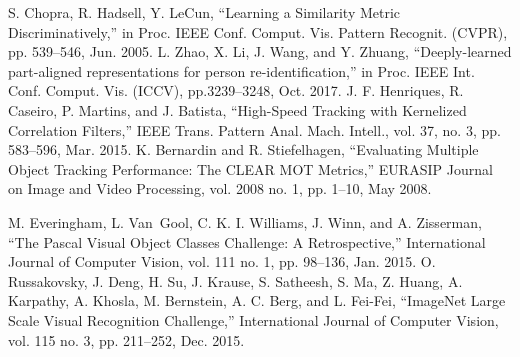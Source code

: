 \documentclass[journal]{IEEEtran}
\newcounter{ct}
\begin{document}
\begin{thebibliography}{00}
S. Chopra, R. Hadsell, Y. LeCun, ``Learning a Similarity Metric Discriminatively,'' in Proc. IEEE Conf. Comput. Vis. Pattern Recognit. (CVPR), pp. 539--546, Jun. 2005.
L. Zhao, X. Li, J. Wang, and Y. Zhuang, ``Deeply-learned part-aligned representations for person re-identification,'' in Proc. IEEE Int. Conf. Comput. Vis. (ICCV), pp.3239--3248, Oct. 2017.
 J. F. Henriques, R. Caseiro, P. Martins, and J. Batista, ``High-Speed Tracking with Kernelized Correlation Filters,'' IEEE Trans. Pattern Anal. Mach. Intell., vol. 37, no. 3, pp. 583--596, Mar. 2015.
 K. Bernardin and R. Stiefelhagen, ``Evaluating Multiple Object Tracking Performance: The CLEAR MOT Metrics,'' EURASIP Journal on Image and Video Processing, vol. 2008 no. 1, pp. 1--10, May 2008.

 M. Everingham, L. Van~Gool, C. K. I. Williams, J. Winn, and A. Zisserman, ``The Pascal Visual Object Classes Challenge: A Retrospective,'' International Journal of Computer Vision, vol. 111 no. 1, pp. 98--136, Jan. 2015.
O. Russakovsky, J. Deng, H. Su, J. Krause, S. Satheesh, S. Ma, Z. Huang, A. Karpathy, A. Khosla, M. Bernstein, A. C. Berg, and L. Fei-Fei, ``ImageNet Large Scale Visual Recognition Challenge,'' International Journal of Computer Vision, vol. 115 no. 3, pp. 211--252, Dec. 2015.

\end{thebibliography}
















\vfill
\end{document}

